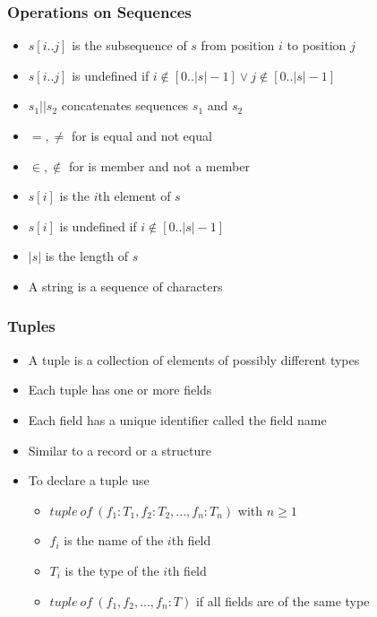 \documentclass[t,12pt,numbers,fleqn]{beamer}
\begin{document}
\begin{frame}
\frametitle{Operations on Sequences}
\begin{itemize}
\item $s[i..j]$ is the subsequence of $s$ from position $i$ to position $j$
\item $s[i..j]$ is undefined if $i \notin [0..|s|-1] \vee j \notin [0 .. |s|-1]$
\item $s_1 || s_2$ concatenates sequences $s_1$ and $s_2$
\item $=, \neq$ for is equal and not equal
\item $\in, \notin$ for is member and not a member
\item $s[i]$ is the $i$th element of $s$
\item $s[i]$ is undefined if $i \notin [0..|s|-1]$
\item $|s|$ is the length of $s$
\item A string is a sequence of characters
\end{itemize}
\end{frame}


\begin{frame}
\frametitle{Tuples}
\begin{itemize}
\item A tuple is a collection of elements of possibly different types
\item Each tuple has one or more fields
\item Each field has a unique identifier called the field name
\item Similar to a record or a structure
\item To declare a tuple use
\begin{itemize}
\item $tuple~of~(f_1: T_1, f_2: T_2, ..., f_n: T_n )$ with $n \geq 1$
\item $f_i$ is the name of the $i$th field
\item $T_i$ is the type of the $i$th field
\item $tuple~of~(f_1, f_2, ..., f_n: T )$ if all fields are of the same type
\end{itemize}
\end{itemize}
\end{frame}

\end{document}
